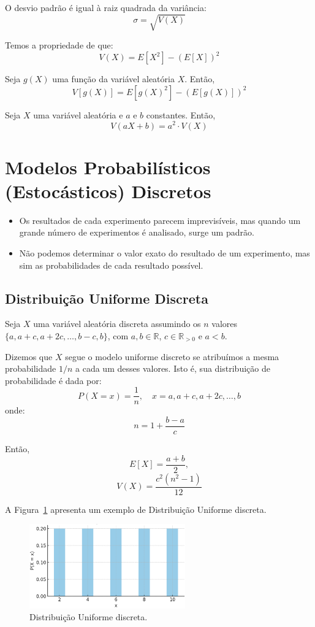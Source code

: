 \documentclass{article}
\begin{document}
O desvio padrão é igual à raiz quadrada da variância:
    $$
    \sigma = \sqrt{V(X)}
    $$

Temos a propriedade de que:
    $$
    V(X) = E[X^2] - (E[X])^2
    $$

Seja $g(X)$ uma função da variável aleatória $X$. Então,
    $$
    V[g(X)] = E[g(X)^2] - \left(E[g(X)]\right)^2
    $$

Seja $X$ uma variável aleatória e $a$ e $b$ constantes. Então,
    $$
    V(aX + b) = a^2 \cdot V(X)
    $$

\section{Modelos Probabilísticos (Estocásticos) Discretos}
\begin{itemize}
    \item Os resultados de cada experimento parecem imprevisíveis, mas quando um grande número de experimentos é analisado, surge um padrão.
    \item Não podemos determinar o valor exato do resultado de um experimento, mas sim as probabilidades de cada resultado possível.
\end{itemize}

\subsection{Distribuição Uniforme Discreta}
Seja $X$ uma variável aleatória discreta assumindo os $n$ valores  $\{a, a + c, a + 2c, \ldots, b - c, b\}$,  com $a, b \in \mathbb{R}$, $c \in \mathbb{R}_{> 0}$ e $a < b$.

Dizemos que $X$ segue o modelo uniforme discreto se atribuímos a mesma probabilidade $1/n$ a cada um desses valores.  
Isto é, sua distribuição de probabilidade é dada por:
    $$
    P(X = x) = \frac{1}{n}, \quad x = a, a + c, a + 2c, \ldots, b
    $$
onde:
    $$
    n = 1 + \frac{b - a}{c}
    $$

Então,
    $$
    E[X] = \frac{a + b}{2},
    $$
    $$
    V(X) = \frac{c^2(n^2 - 1)}{12}
    $$

A Figura~\ref{fig:dist_disc_uniforme} apresenta um exemplo de Distribuição Uniforme discreta.

\begin{figure}[H]
    \centering
    \includegraphics[width=0.6\textwidth]{figuras/dist_disc_uniforme.png}
    \caption{Distribuição Uniforme discreta.}
    \label{fig:dist_disc_uniforme}
\end{figure}
\end{document}
